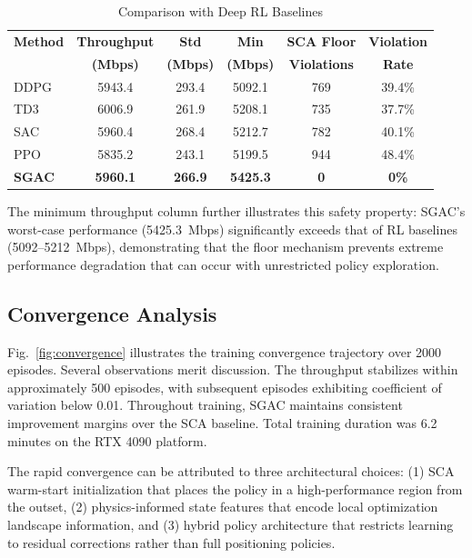 \documentclass[journal]{IEEEtran}
\begin{document}
\begin{table}[t]
\centering
\caption{Comparison with Deep RL Baselines}
\label{tab:rl_baselines}
\begin{tabular}{lccccc}
\toprule
\textbf{Method} & \textbf{Throughput} & \textbf{Std} & \textbf{Min} & \textbf{SCA Floor} & \textbf{Violation} \\
 & \textbf{(Mbps)} & \textbf{(Mbps)} & \textbf{(Mbps)} & \textbf{Violations} & \textbf{Rate} \\
\midrule
DDPG & 5943.4 & 293.4 & 5092.1 & 769 & 39.4\% \\
TD3 & 6006.9 & 261.9 & 5208.1 & 735 & 37.7\% \\
SAC & 5960.4 & 268.4 & 5212.7 & 782 & 40.1\% \\
PPO & 5835.2 & 243.1 & 5199.5 & 944 & 48.4\% \\
\midrule
\textbf{SGAC} & \textbf{5960.1} & \textbf{266.9} & \textbf{5425.3} & \textbf{0} & \textbf{0\%} \\
\bottomrule
\end{tabular}
\end{table}

The minimum throughput column further illustrates this safety property: SGAC's worst-case performance (5425.3~Mbps) significantly exceeds that of RL baselines (5092--5212~Mbps), demonstrating that the floor mechanism prevents extreme performance degradation that can occur with unrestricted policy exploration.

\subsection{Convergence Analysis}

Fig.~\ref{fig:convergence} illustrates the training convergence trajectory over 2000 episodes. Several observations merit discussion. The throughput stabilizes within approximately 500 episodes, with subsequent episodes exhibiting coefficient of variation below 0.01. Throughout training, SGAC maintains consistent improvement margins over the SCA baseline. Total training duration was 6.2 minutes on the RTX 4090 platform.

The rapid convergence can be attributed to three architectural choices: (1) SCA warm-start initialization that places the policy in a high-performance region from the outset, (2) physics-informed state features that encode local optimization landscape information, and (3) hybrid policy architecture that restricts learning to residual corrections rather than full positioning policies.
\end{document}
